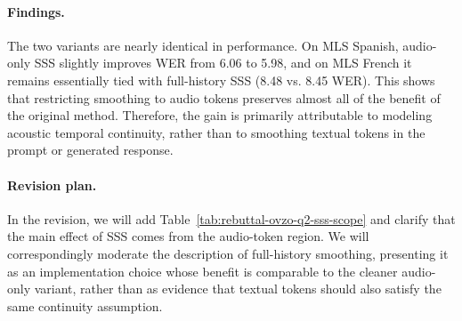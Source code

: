 \begin{answer}
    \paragraph{Findings.}
    The two variants are nearly identical in performance.
    On MLS Spanish, audio-only SSS slightly improves WER from 6.06 to 5.98, and on MLS French it remains essentially tied with full-history SSS (8.48 vs. 8.45 WER).
    This shows that restricting smoothing to audio tokens preserves almost all of the benefit of the original method.
    Therefore, the gain is primarily attributable to modeling acoustic temporal continuity, rather than to smoothing textual tokens in the prompt or generated response.

    \paragraph{Revision plan.}
    In the revision, we will add Table~\ref{tab:rebuttal-ovzo-q2-sss-scope} and clarify that the main effect of SSS comes from the audio-token region.
    We will correspondingly moderate the description of full-history smoothing, presenting it as an implementation choice whose benefit is comparable to the cleaner audio-only variant, rather than as evidence that textual tokens should also satisfy the same continuity assumption.
\end{answer}

